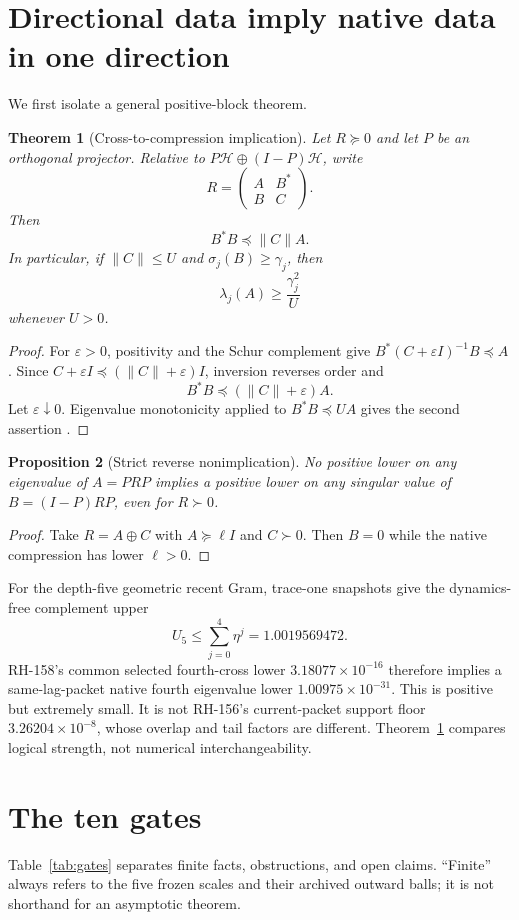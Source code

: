 \documentclass[12pt]{article}
\newtheorem{theorem}{Theorem}
\newtheorem{proposition}[theorem]{Proposition}
\begin{document}
\section{Directional data imply native data in one direction}
We first isolate a general positive-block theorem.

\begin{theorem}[Cross-to-compression implication]\label{thm:block}
Let $R\succeq0$ and let $P$ be an orthogonal projector.  Relative to
$P\mathcal H\oplus(I-P)\mathcal H$, write
\[
 R=\begin{pmatrix}A&B^*\\B&C\end{pmatrix}.
\]
Then
\[
 B^*B\preceq\|C\|A.
\]
In particular, if $\|C\|\leq U$ and $\sigma_j(B)\geq\gamma_j$, then
\[
 \lambda_j(A)\geq \frac{\gamma_j^2}{U}
\]
whenever $U>0$.
\end{theorem}
\begin{proof}
For $\varepsilon>0$, positivity and the Schur complement give
$B^*(C+\varepsilon I)^{-1}B\preceq A$.  Since
$C+\varepsilon I\preceq(\|C\|+\varepsilon)I$, inversion reverses order and
\[
 B^*B\preceq(\|C\|+\varepsilon)A.
\]
Let $\varepsilon\downarrow0$.  Eigenvalue monotonicity applied to
$B^*B\preceq UA$ gives the second assertion
\citep{Bhatia1997,HornJohnson2013}.
\end{proof}

\begin{proposition}[Strict reverse nonimplication]\label{prop:reverse}
No positive lower on any eigenvalue of $A=PRP$ implies a positive lower on
any singular value of $B=(I-P)RP$, even for $R\succ0$.
\end{proposition}
\begin{proof}
Take $R=A\oplus C$ with $A\succeq\ell I$ and $C\succ0$.  Then $B=0$ while
the native compression has lower $\ell>0$.
\end{proof}

For the depth-five geometric recent Gram, trace-one snapshots give the
dynamics-free complement upper
\[
 U_5\leq\sum_{j=0}^{4}\eta^j=1.0019569472.
\]
RH-158's common selected fourth-cross lower
$3.18077\times10^{-16}$ therefore implies a same-lag-packet native fourth
eigenvalue lower $1.00975\times10^{-31}$.  This is positive but extremely
small.  It is not RH-156's current-packet support floor
$3.26204\times10^{-8}$, whose overlap and tail factors are different.
Theorem~\ref{thm:block} compares logical strength, not numerical
interchangeability.

\section{The ten gates}
Table~\ref{tab:gates} separates finite facts, obstructions, and open claims.
``Finite'' always refers to the five frozen scales and their archived outward
balls; it is not shorthand for an asymptotic theorem.
\end{document}
